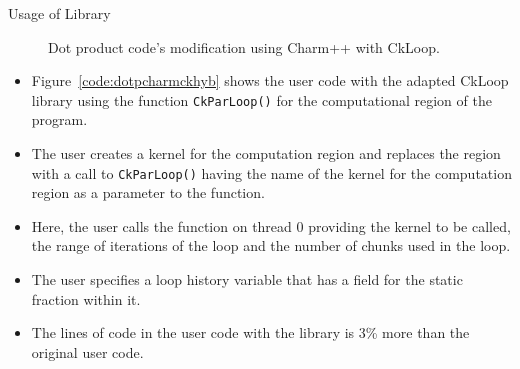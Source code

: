 \begin{frame}{Usage of Library}
\vspace*{-0.1in}
\begin{figure}[h!t]
%

    \label{code:dotpCharmckhyb}
    \vspace*{-0.8in}\caption{\label{code:dotPCharmckhyb}{\tiny  \label{code:dotpCharmckhyb} Dot product code's modification using Charm++ with CkLoop.}}
 
\end{figure}

\begin{itemize} 
\tiny  \item \tiny Figure~\ref{code:dotpcharmckhyb}
shows the user code with the adapted CkLoop library using the function {\tt CkParLoop()} for the computational region of the program.
\item \tiny The user creates a kernel for the computation region and replaces the region with a call to {\tt CkParLoop()} having the name of the kernel for the computation region as a parameter to the function.
\item \tiny Here, the user calls the function on thread 0 providing the kernel to be called, the range of iterations of the loop and the number of chunks used in the loop. 
\item \tiny The user specifies a loop history variable that has a field for the static fraction within it. 
\item \tiny The lines of code in the user code with the library is 3\% more than the original user code.
\end{itemize} 
\end{frame} 


